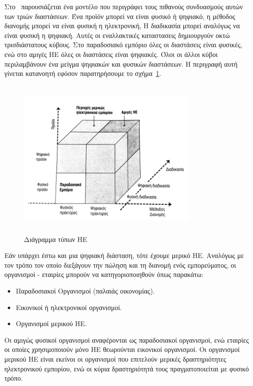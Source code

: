 \documentclass[12pt]{report}
\begin{document}
Στο~\cite{choi_stahl_whinston_1997} παρουσιάζεται ένα μοντέλο που περιγράφει τους πιθανούς συνδυασμούς αυτών των τριών διαστάσεων. Ένα προϊόν μπορεί να είναι φυσικό ή ψηφιακό, η μέθοδος διανομής μπορεί να είναι φυσική η ηλεκτρονική, Η διαδικασία μπορεί αναλόγως να είναι φυσική η ψηφιακή. Αυτές οι εναλλακτικές καταστασεις δημιουργούν οκτώ τρισδιάστατους κύβους. Στο παραδοσιακό εμπόριο όλες οι διαστάσεις είναι φυσικές, ενώ στο αμιγές ΗΕ όλες οι διαστάσεις είναι ψηφιακές. Όλοι οι άλλοι κύβοι περιλαμβάνουν ένα μείγμα ψηφιακών και φυσικών διαστάσεων. Η περιγραφή αυτή γίνεται κατανοητή εφόσον παρατηρήσουμε το σχήμα~\ref{fig:ec_dimensions}.
\begin{figure}[h]
\centering
\includegraphics[width=0.8\textwidth, height=8cm]{ec-dimensions}
\caption{Διάγραμμα τύπων ΗΕ}
\label{fig:ec_dimensions}
\end{figure}
Εάν υπάρχει έστω και μια ψηφιακή διάσταση, τότε έχουμε μερικό ΗΕ. Αναλόγως με τον τρόπο τον οποίο διεξάγουν την πώληση και τη διανομή ενός εμπορεύματος, οι οργανισμοί - εταιρίες μπορούν να κατηγοριοποιηθούν όπως παρακάτω:
\begin{itemize}
  \item Παραδοσιακοί Οργανισμοί (παλαιάς οικονομίας).
  \item Εικονικοί ή ηλεκτρονικοί οργανισμοί.
  \item Οργανισμοί μερικού ΗΕ.
\end{itemize}
Οι αμιγώς φυσικοί οργανισμοί αναφέρονται ως παραδοσιακοί οργανισμοί, ενώ εταιρίες οι οποίες χρησιμοποιούν μόνο ΗΕ θεωρούνται εικονικοί οργανισμοί. Οι οργανισμοί μερικού ΗΕ είναι εκείνοι οι οργανισμοί που επιτελούν μερικές δραστηριότητες ηλεκτρονικού εμπορίου, ενώ οι κύρια δραστηριότητά τους πραγματοποιείται με φυσικό τρόπο.
\end{document}
